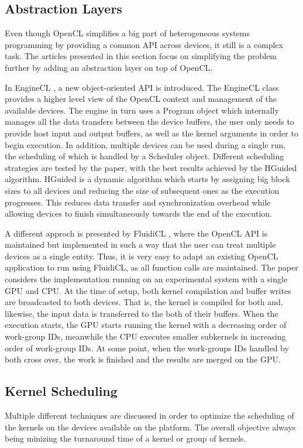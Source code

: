 \subsection{Abstraction Layers}
Even though OpenCL simplifies a big part of heterogeneous systems programming by providing a common API across devices, it still is a complex task. 
The articles presented in this section focus on simplifying the problem further by adding an abstraction layer on top of OpenCL.

In EngineCL \cite{enginecl}, a new object-oriented API is introduced. The EngineCL class provides a higher level view of the OpenCL context and management of the available devices. The engine in turn uses a Program object which internally manages all the data transfers between the device buffers, the user only needs to provide host input and output buffers, as well as the kernel arguments in order to begin execution. In addition, multiple devices can be used during a single run, the scheduling of which is handled by a Scheduler object. Different scheduling strategies are tested by the paper, with the best results achieved by the HGuided algorithm. HGuided is a dynamic algorithm which starts by assigning big block sizes to all devices and reducing the size of subsequent ones as the execution progresses. This reduces data transfer and synchronization overhead while allowing devices to finish simultaneously towards the end of the execution.

A different approch is presented by FluidiCL \cite{fluidicl}, where the OpenCL API is maintained but implemented in such a way that the user can treat multiple devices as a single entity. Thus, it is very easy to adapt an existing OpenCL application to run using FluidiCL, as all function calls are maintained. The paper considers the implementation running on an experimental system with a single GPU and CPU. At the time of setup, both kernel compilation and buffer writes are broadcasted to both devices. That is, the kernel is compiled for both and, likewise, the input data is transferred to the both of their buffers. When the execution starts, the GPU starts running the kernel with a decreasing order of work-group IDs, meanwhile the CPU executes smaller subkernels in increasing order of work-group IDs. At some point, when the work-groups IDs handled by both cross over, the work is finished and the results are merged on the GPU.

\subsection{Kernel Scheduling}
Multiple different techniques are discussed in order to optimize the scheduling of the kernels on the devices available on the platform. The overall objective always being minizing the turnaround time of a kernel or group of kernels.

